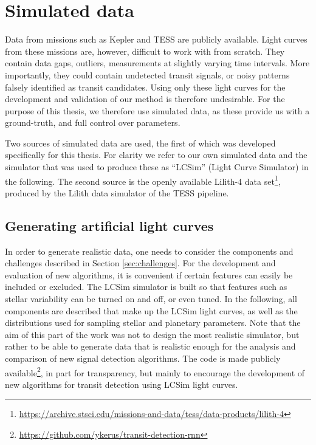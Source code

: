 
\section{Simulated data}
Data from missions such as Kepler and TESS are publicly available. Light curves from these missions are, however, difficult to work with from scratch. They contain data gaps, outliers, measurements at slightly varying time intervals. More importantly, they could contain undetected transit signals, or noisy patterns falsely identified as transit candidates. Using only these light curves for the development and validation of our method is therefore undesirable. For the purpose of this thesis, we therefore use simulated data, as these provide us with a ground-truth, and full control over parameters. 

Two sources of simulated data are used, the first of which was developed specifically for this thesis. For clarity we refer to our own simulated data and the simulator that was used to produce these as ``LCSim'' (Light Curve Simulator) in the following. The second source is the openly available Lilith-4 data set\footnote{\url{https://archive.stsci.edu/missions-and-data/tess/data-products/lilith-4}}, produced by the Lilith data simulator of the TESS pipeline.

\subsection{Generating artificial light curves}
In order to generate realistic data, one needs to consider the components and challenges described in Section \ref{sec:challenges}. For the development and evaluation of new algorithms, it is convenient if certain features can easily be included or excluded. The LCSim simulator is built so that features such as stellar variability can be turned on and off, or even tuned. In the following, all components are described that make up the LCSim light curves, as well as the distributions used for sampling stellar and planetary parameters. Note that the aim of this part of the work was not to design the most realistic simulator, but rather to be able to generate data that is realistic enough for the analysis and comparison of new signal detection algorithms. The code is made publicly available\footnote{\url{https://github.com/ykerus/transit-detection-rnn}}, in part for transparency, but mainly to encourage the development of new algorithms for transit detection using LCSim light curves. 

